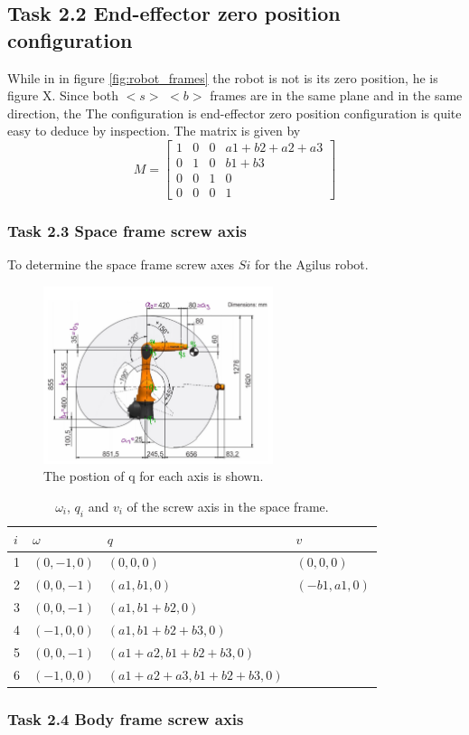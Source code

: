 \subsection{Task 2.2 End-effector zero position configuration}
While in in figure \ref{fig:robot_frames} the robot is not is its zero position, he is figure X. Since both $<s>$ $<b>$ frames are in the same plane and in the same direction, the The configuration is end-effector zero position configuration is quite easy to deduce by inspection. The matrix is given by
\begin{equation}
    M = 
    \begin{bmatrix}
    1 & 0 & 0 & a1+b2+a2+a3 \\
    0 & 1 & 0 & b1+b3 \\
    0 & 0 & 1 & 0 \\
    0 & 0 & 0 & 1
    \end{bmatrix}
\end{equation}

\subsubsection{Task 2.3 Space frame screw axis}
To determine the space frame screw axes $Si$ for the Agilus robot.

\begin{figure}[H]
    \centering
    \includegraphics[width=0.6\textwidth]{Images/Task2/robot_q.jpg}
    \caption[q-positions]{The postion of q for each axis is shown.}
    \label{fig:robot_q}
\end{figure}

\begin{table}[]
\begin{tabular}{|l|l|l|l|}
\hline
$i$ & $\omega$ & $q$ & $v$ \\ \hline
1 & $(0, -1, 0)$ & $(0, 0, 0)$ & $(0, 0, 0)$ \\ \hline
2 & $(0, 0,-1)$ & $(a1,b1,0)$ & $(-b1, a1, 0)$ \\ \hline
3 & $(0, 0,-1)$ & $(a1,b1+b2,0)$ &  \\ \hline
4 & $(-1, 0, 0)$ & $(a1,b1+b2+b3,0)$ &  \\ \hline
5 & $(0, 0,-1)$ & $(a1+a2,b1+b2+b3,0)$ &  \\ \hline
6 & $(-1, 0, 0)$ & $(a1+a2+a3,b1+b2+b3,0)$ &  \\ \hline
\end{tabular}
\caption{$\omega_i$, $q_i$ and $v_i$ of the screw axis in the space frame.}
\label{tab:screw-axis}
\end{table}

\subsubsection{Task 2.4 Body frame screw axis} 



